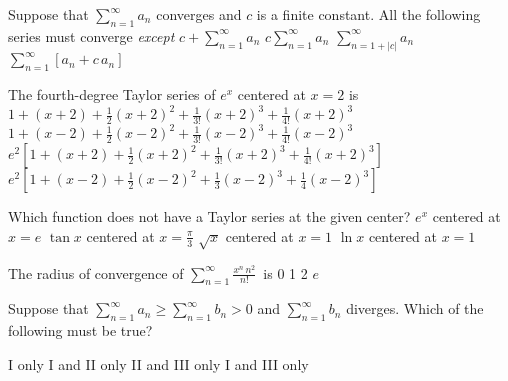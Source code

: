 \begin{question}
Suppose that \(\sum_{n = 1}^\infty a_n\) converges and \(c\) is a finite constant. All the following series must converge \emph{except}
\choices
{\(c + \sum_{n = 1}^\infty a_n\)}
{\(c \sum_{n = 1}^\infty a_n\)}
{\(\sum_{n = 1 + |c|}^\infty a_n\)}
{}
{\(\sum_{n = 1}^\infty [a_n + c \, a_n]\)}
\end{question}

\begin{question}
The fourth-degree Taylor series of \(e^x\) centered at \(x = 2\) is 
\choices
{\(1 + (x + 2) + \frac{1}{2}(x + 2)^2 + \frac{1}{3!}(x + 2)^3 + \frac{1}{4!}(x + 2)^3\)}
{\(1 + (x - 2) + \frac{1}{2}(x - 2)^2 + \frac{1}{3!}(x - 2)^3 + \frac{1}{4!}(x - 2)^3\)}
{\(e^2 \left[1 + (x + 2) + \frac{1}{2}(x + 2)^2 + \frac{1}{3!}(x + 2)^3 + \frac{1}{4!}(x + 2)^3 \right]\)}
{}
{\(e^2 \left[1 + (x - 2) + \frac{1}{2}(x - 2)^2 + \frac{1}{3}(x - 2)^3 + \frac{1}{4}(x - 2)^3 \right]\)}
\end{question}

\begin{question}
Which function does not have a Taylor series at the given center?
\choices
{\(e^x\) centered at \(x = e\)}
{\(\tan x\) centered at \(x = \frac{\pi}{3}\)}
{\(\sqrt x\) centered at \(x = 1\)}
{\(\ln x\) centered at \(x = 1\)}
{}
\end{question}

\begin{question}
The radius of convergence of \(\sum_{n = 1}^\infty \frac{x^n \, n^2}{n!} \,\) is
\choicesline
{0}
{1}
{2}
{\(e\)}
{\ans{\(\infty\)}}
\end{question}

\begin{question}
Suppose that \(\sum_{n = 1}^\infty a_n \geqslant \sum_{n = 1}^\infty b_n > 0\) and \(\sum_{n = 1}^\infty b_n\) diverges. Which of the following must be true?


\choices
{I only}
{I and II only }
{II and III only}
{I and III only}
{}
\end{question}


